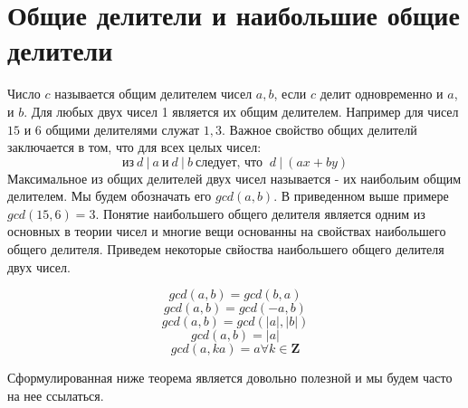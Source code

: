 \section{Общие делители и наибольшие общие делители}
{
Число $c$ называется общим делителем чисел $a,b$, если $c$ делит одновременно и $a$, и $b$. Для любых двух чисел 1 является их общим делителем. 
Например для чисел $15$ и $6$ общими делителями служат $1,3$.
Важное свойство общих делителй заключается в том, что для всех целых чисел:
\begin{equation}
\label{a|b&a|c=>a|b+c}
\textit{из}\ d\ |\ a\ \textit{и}\ d\ |\ b\ \textit{следует, что }\ d\ |\ (ax+by)
\end{equation}
Максимальное из общих делителей двух чисел называется - их наибольим общим делителем. Мы будем обозначать его $gcd(a,b)$.
В приведенном выше примере $gcd(15,6)=3$. Понятие наибольшего общего делителя является одним из основных в теории чисел и многие вещи основанны на свойствах наибольшего общего делителя.
Приведем некоторые свйоства наибольшего общего делителя двух чисел.


\begin{equation}
\label{gcd(a,b)=gcd(b,a)}
gcd(a,b)=gcd(b,a)
\end{equation}
\begin{equation}
\label{gcd(a,b)=gcd(-a,b)}
gcd(a,b)=gcd(-a,b)
\end{equation}
\begin{equation}
\label{gcd(a,b)=gcd(|a|,|b|)}
gcd(a,b)=gcd(|a|,|b|)
\end{equation}
\begin{equation}
\label{gcd(a,0)=a}
gcd(a,b)=|a|
\end{equation}
\begin{equation}
\label{gcd(a,ka)=a}
gcd(a,ka)=a \forall k \in \textbf{Z}
\end{equation}
}

Сформулированная ниже теорема является довольно полезной и мы будем часто на нее ссылаться.

